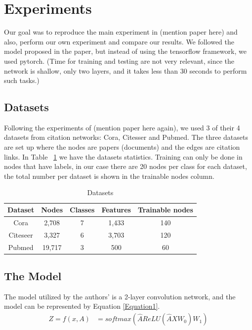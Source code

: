 \section{Experiments}
Our goal was to reproduce the main experiment in (mention paper here) and also, perform our own experiment and compare our results. We followed the model proposed in the paper, but instead of using the tensorflow framework, we used pytorch. (Time for training and testing are not very relevant, since the network is shallow, only two layers, and it takes less than 30 seconds to perform such tasks.) 

\subsection{Datasets}

Following the experiments of (mention paper here again), we used 3 of their 4 datasets from citation networks: Cora, Citesser and Pubmed. The three datasets are set up where the nodes are papers (documents) and the edges are citation links. In Table ~\ref{tab:datasets} we have the datasets statistics. Training can only be done in nodes that have labels, in our case there are 20 nodes per class for each dataset, the total number per dataset is shown in the trainable nodes column.

\begin {table}[ht]
\caption {Datasets} \label{tab:datasets} 
  \begin{center}
    \begin{tabular}{|c|c|c|c|c|}
    \hline
    Dataset  & Nodes  & Classes & Features & Trainable nodes\\
    \hline 
    Cora     & 2,708  & 7       & 1,433    & 140 \\ 
    Citeseer & 3,327  & 6       & 3,703    & 120  \\  
    Pubmed   & 19,717 & 3       & 500      & 60   \\
    \hline
    \end{tabular}
  \end{center}
\end{table}

\subsection{The Model}
The model utilized by the authors' is a 2-layer convolution network, and the model can be represented by Equation \ref{Equation1}.
\begin{align*}
    Z = f(x,A) &= softmax(\hat{A}ReLU(\hat{A}XW_{0})W_{1}) 
\end{align*}\label{Equation1}

